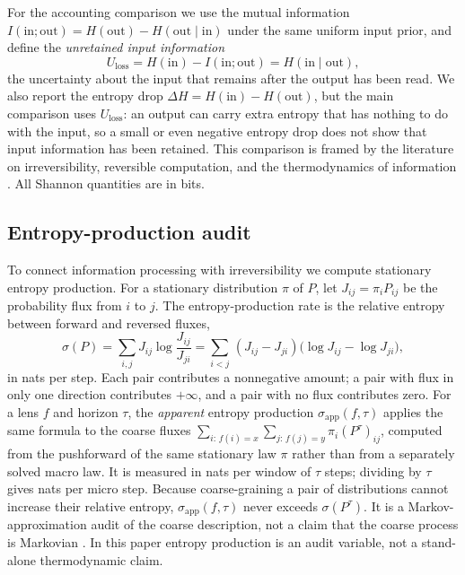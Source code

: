 For the accounting comparison we use the mutual information \(I(\mathrm{in};\mathrm{out}) = H(\mathrm{out}) - H(\mathrm{out}\mid\mathrm{in})\) under the same uniform input prior, and define the \emph{unretained input information}
\[
U_{\text{loss}}
=
H(\mathrm{in}) - I(\mathrm{in};\mathrm{out})
=
H(\mathrm{in}\mid\mathrm{out}),
\]
the uncertainty about the input that remains after the output has been read. We also report the entropy drop \(\Delta H = H(\mathrm{in}) - H(\mathrm{out})\), but the main comparison uses \(U_{\text{loss}}\): an output can carry extra entropy that has nothing to do with the input, so a small or even negative entropy drop does not show that input information has been retained. This comparison is framed by the literature on irreversibility, reversible computation, and the thermodynamics of information \cite{landauer1961,bennett1973,bennett1982thermodynamics,parrondo2015thermoinfo}. All Shannon quantities are in bits.

\subsection{Entropy-production audit}

To connect information processing with irreversibility we compute stationary entropy production. For a stationary distribution \(\pi\) of \(P\), let \(J_{ij}=\pi_i P_{ij}\) be the probability flux from \(i\) to \(j\). The entropy-production rate is the relative entropy between forward and reversed fluxes,
\[
\sigma(P)
=
\sum_{i,j} J_{ij}\log\frac{J_{ij}}{J_{ji}}
=
\sum_{i<j}\,(J_{ij}-J_{ji})\bigl(\log J_{ij}-\log J_{ji}\bigr),
\]
in nats per step. Each pair contributes a nonnegative amount; a pair with flux in only one direction contributes \(+\infty\), and a pair with no flux contributes zero. For a lens \(f\) and horizon \(\tau\), the \emph{apparent} entropy production \(\sigma_{\mathrm{app}}(f,\tau)\) applies the same formula to the coarse fluxes \(\sum_{i:\,f(i)=x}\sum_{j:\,f(j)=y}\pi_i(P^\tau)_{ij}\), computed from the pushforward of the same stationary law \(\pi\) rather than from a separately solved macro law. It is measured in nats per window of \(\tau\) steps; dividing by \(\tau\) gives nats per micro step. Because coarse-graining a pair of distributions cannot increase their relative entropy, \(\sigma_{\mathrm{app}}(f,\tau)\) never exceeds \(\sigma(P^\tau)\). It is a Markov-approximation audit of the coarse description, not a claim that the coarse process is Markovian \cite{esposito2012coarsegraining,kawaguchi2013hiddenepr}. In this paper entropy production is an audit variable, not a stand-alone thermodynamic claim.

